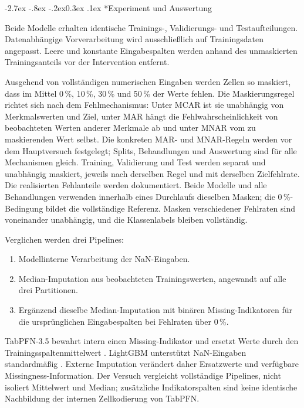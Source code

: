 \documentclass[12pt,a4paper]{article}
\makeatletter
\renewcommand\subsection{\@startsection{subsection}{2}{\z@}%
  {-2.7ex \@plus -.8ex \@minus -.2ex}{0.3ex \@plus .1ex}%
  {\normalfont\large\bfseries}}
\makeatother
\begin{document}
\subsection*{Experiment und Auswertung}

Beide Modelle erhalten identische Trainings-,
Validierungs- und Testaufteilungen. Datenabhängige Vorverarbeitung
wird ausschließlich auf Trainingsdaten angepasst. Leere und konstante
Eingabespalten werden anhand des unmaskierten Trainingsanteils vor
der Intervention entfernt.

Ausgehend von vollständigen numerischen Eingaben werden Zellen so
maskiert, dass im Mittel 0\,\%, 10\,\%, 30\,\% und 50\,\% der Werte
fehlen. Die Maskierungsregel richtet sich nach dem Fehlmechanismus:
Unter MCAR ist sie unabhängig von Merkmalswerten und Ziel, unter MAR
hängt die Fehlwahrscheinlichkeit von beobachteten Werten anderer
Merkmale ab und unter MNAR vom zu maskierenden Wert selbst. Die
konkreten MAR- und MNAR-Regeln werden vor dem Hauptversuch
festgelegt; Splits, Behandlungen und Auswertung sind für alle
Mechanismen gleich.
Training, Validierung und Test werden separat und unabhängig
maskiert, jeweils nach derselben Regel und mit derselben
Zielfehlrate. Die realisierten Fehlanteile werden dokumentiert. Beide
Modelle und alle Behandlungen verwenden innerhalb eines Durchlaufs
dieselben Masken; die 0\,\%-Bedingung bildet die vollständige
Referenz. Masken verschiedener Fehlraten sind voneinander unabhängig,
und die Klassenlabels bleiben vollständig.

Verglichen werden drei Pipelines:
\begin{enumerate}
  \item Modellinterne Verarbeitung der NaN-Eingaben.
  \item Median-Imputation aus beobachteten Trainingswerten,
        angewandt auf alle drei Partitionen.
  \item Ergänzend dieselbe Median-Imputation mit binären
        Missing-Indikatoren für die ursprünglichen Eingabespalten
        bei Fehlraten über 0\,\%.
\end{enumerate}
TabPFN-3.5 bewahrt intern einen Missing-Indikator und ersetzt Werte
durch den Trainingsspaltenmittelwert
\cite[Abschnitt 3.1, Abb.~8]{jager_tabpfn-35_2026}.
LightGBM unterstützt NaN-Eingaben standardmäßig
\cite{lightgbm_missing_docs_2026}.
Externe Imputation verändert daher Ersatzwerte und verfügbare
Missingness-Information. Der Versuch vergleicht vollständige
Pipelines, nicht isoliert Mittelwert und Median; zusätzliche
Indikatorspalten sind keine identische Nachbildung der internen
Zellkodierung von TabPFN.
\end{document}
